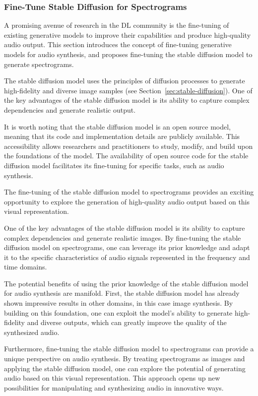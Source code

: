 \subsubsection{Fine-Tune Stable Diffusion for Spectrograms}

A promising avenue of research in the \ac{DL} community is the fine-tuning of existing generative models to improve their capabilities and produce high-quality audio output. This section introduces the concept of fine-tuning generative models for audio synthesis, and proposes fine-tuning the stable diffusion model to generate spectrograms.

The stable diffusion model uses the principles of diffusion processes to generate high-fidelity and diverse image samples (see Section\ \ref{sec:stable-diffusion}). One of the key advantages of the stable diffusion model is its ability to capture complex dependencies and generate realistic output.

It is worth noting that the stable diffusion model is an open source model, meaning that its code and implementation details are publicly available. This accessibility allows researchers and practitioners to study, modify, and build upon the foundations of the model. The availability of open source code for the stable diffusion model facilitates its fine-tuning for specific tasks, such as audio synthesis.

The fine-tuning of the stable diffusion model to spectrograms provides an exciting opportunity to explore the generation of high-quality audio output based on this visual representation.

One of the key advantages of the stable diffusion model is its ability to capture complex dependencies and generate realistic images. By fine-tuning the stable diffusion model on spectrograms, one can leverage its prior knowledge and adapt it to the specific characteristics of audio signals represented in the frequency and time domains.

The potential benefits of using the prior knowledge of the stable diffusion model for audio synthesis are manifold. First, the stable diffusion model has already shown impressive results in other domains, in this case image synthesis. By building on this foundation, one can exploit the model's ability to generate high-fidelity and diverse outputs, which can greatly improve the quality of the synthesized audio.

Furthermore, fine-tuning the stable diffusion model to spectrograms can provide a unique perspective on audio synthesis. By treating spectrograms as images and applying the stable diffusion model, one can explore the potential of generating audio based on this visual representation. This approach opens up new possibilities for manipulating and synthesizing audio in innovative ways.

